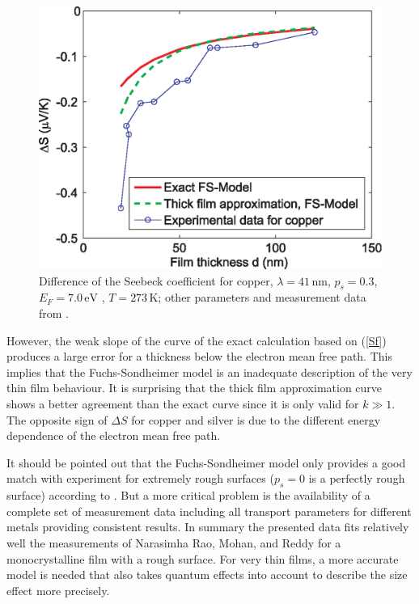 \documentclass[journal]{IEEEtran}
\newcommand{\mathrmm}[1]{{#1}}
\begin{document}
\begin{figure}[h]
\centerline{\includegraphics[width=.95\columnwidth,clip]{figures/CNMRn} } %
\caption{Difference of the Seebeck coefficient for copper, $\lambda = 41\, \mathrm{nm}$, $p_s = 0.3$, $E_\mathrmm{F} = 7.0\, \mathrm{eV}$ \cite{ibach2003solid}, $T = 273\, \mathrm{K}$; other parameters and measurement data from \cite{rao1976electrical}.}
\label{fig:FigCopper}
\end{figure}
%

However, the weak slope of the curve of the exact calculation
based on (\ref{Sf}) produces a large error for a thickness below the electron mean free path. This implies that the Fuchs-Sondheimer model is an inadequate description of the very thin film behaviour. It is surprising that the thick film approximation curve shows a better agreement than the exact curve since it is only valid for $k \gg1$. The opposite sign of $\Delta S$ for copper and silver is due to the different energy dependence of the electron mean free path.

It should be pointed out that the Fuchs-Sondheimer model only provides a good match with experiment for extremely rough surfaces ($p_s=0$ is a perfectly rough surface) according to \cite{sambles1983resistivity}. But a more critical problem is the availability of a complete set of measurement data including all transport parameters for different metals providing consistent results. In summary the presented data fits relatively well the measurements of Narasimha Rao, Mohan, and Reddy for a monocrystalline film with a rough surface. For very thin films, a more accurate model is needed that also takes quantum effects into account to describe the size effect more precisely.
\end{document}
